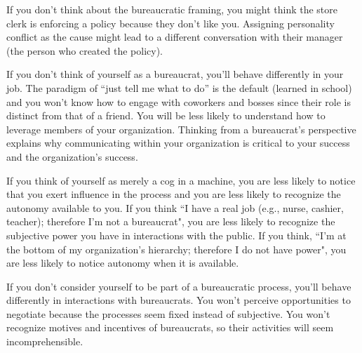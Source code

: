 If you don't think about the bureaucratic framing, you might think the store clerk is enforcing a policy because they don't like you. Assigning personality conflict as the cause might lead to a different conversation with their manager (the person who created the policy). 

If you don't think of yourself as a bureaucrat, you'll behave differently in your job. The paradigm of ``just tell me what to do'' is the default (learned in school) and you won't know how to engage with coworkers and bosses since their role is distinct from that of a friend. You will be less likely to understand how to leverage members of your organization. Thinking from a bureaucrat's perspective explains why communicating within your organization is critical to your success and the organization's success. 

If you think of yourself as merely a cog in a machine, you are less likely to notice that you exert influence in the process and you are less likely to recognize the autonomy available to you. 
If you think ``I have a real job (e.g., nurse, cashier, teacher); therefore I'm not a bureaucrat", you are less likely to recognize the subjective power you have in interactions with the public.
If you think, ``I'm at the bottom of my organization's hierarchy; therefore I do not have power", you are less likely to notice autonomy when it is available.

If you don't consider yourself to be part of a bureaucratic process, you'll behave differently in interactions with bureaucrats.  You won't perceive opportunities to negotiate because the processes seem fixed instead of subjective. 
You won't recognize motives and incentives of bureaucrats, so their activities will seem incomprehensible.


